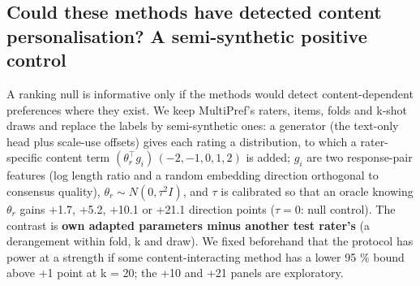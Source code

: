 \documentclass{article}
\begin{document}
\subsection{Could these methods have detected content personalisation? A semi-synthetic positive control}

A ranking null is informative only if the methods would detect content-dependent preferences where they exist. We keep MultiPref's raters, items, folds and k-shot draws and replace the labels by semi-synthetic ones: a generator (the text-only head plus scale-use offsets) gives each rating a distribution, to which a rater-specific content term \((\theta_r^\top g_i)\,(-2,-1,0,1,2)\) is added; \(g_i\) are two response-pair features (log length ratio and a random embedding direction orthogonal to consensus quality), \(\theta_r \sim N(0, \tau^2 I)\), and \(\tau\) is calibrated so that an oracle knowing \(\theta_r\) gains +1.7, +5.2, +10.1 or +21.1 direction points (\(\tau = 0\): null control). The contrast is \textbf{own adapted parameters minus another test rater's} (a derangement within fold, k and draw). We fixed beforehand that the protocol has power at a strength if some content-interacting method has a lower 95 \% bound above +1 point at k = 20; the +10 and +21 panels are exploratory.
\end{document}
